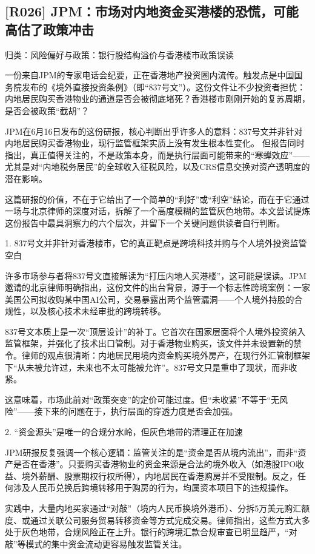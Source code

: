 \documentclass[11pt]{ctexart}
\begin{document}
\subsection{[R026] JPM：市场对内地资金买港楼的恐慌，可能高估了政策冲击}
{\small\color{refgray}归类：风险偏好与政策：银行股结构溢价与香港楼市政策误读}

一份来自JPM的专家电话会纪要，正在香港地产投资圈内流传。触发点是中国国务院发布的《境外直接投资条例》（即“837号文”）。这份文件让不少投资者担忧：内地居民购买香港物业的通道是否会被彻底堵死？香港楼市刚刚开始的复苏周期，是否会被政策“截胡”？

JPM在6月16日发布的这份研报，核心判断出乎许多人的意料：837号文并非针对内地居民购买香港物业，现行监管框架实质上没有发生根本性变化。 但报告同时指出，真正值得关注的，不是政策本身，而是执行层面可能带来的“寒蝉效应”——尤其是对“内地税务居民”的全球收入征税风险，以及CRS信息交换对资产透明度的潜在影响。

这篇研报的价值，不在于它给出了一个简单的“利好”或“利空”结论，而在于它通过一场与北京律师的深度对话，拆解了一个高度模糊的监管灰色地带。本文尝试提炼这份报告中最具洞察力的六个层次，并留下一个关键问题供读者自行判断。

1. 837号文并非针对香港楼市，它的真正靶点是跨境科技并购与个人境外投资监管空白

许多市场参与者将837号文直接解读为“打压内地人买港楼”，这可能是误读。JPM邀请的北京律师明确指出，这份文件的出台背景，源于一个标志性跨境案例：一家美国公司拟收购某中国AI公司，交易暴露出两个监管漏洞——个人境外持股的合规性，以及核心技术未经审批的跨境转移。

837号文本质上是一次“顶层设计”的补丁。它首次在国家层面将个人境外投资纳入监管框架，并强化了技术出口管制。对于香港物业购买，该文件并未设置新的禁令。律师的观点很清晰：内地居民用境内资金购买境外房产，在现行外汇管制框架下“从未被允许过，未来也不太可能被允许”。837号文只是重申了现状，而非收紧。

这意味着，市场此前对“政策突变”的定价可能过度。但“未收紧”不等于“无风险”——接下来的问题在于，执行层面的穿透力度是否会加强。

2. “资金源头”是唯一的合规分水岭，但灰色地带的清理正在加速

JPM研报反复强调一个核心逻辑：监管关注的是“资金是否从境内流出”，而非“资产是否在香港”。只要购买香港物业的资金来源是合法的境外收入（如港股IPO收益、境外薪酬、股票期权行权所得），内地居民在香港购房并不受限制。反之，任何涉及人民币兑换后跨境转移用于购房的行为，均属资本项目下的违规操作。

实践中，大量内地买家通过“对敲”（境内人民币换境外港币）、分拆5万美元购汇额度、或通过关联公司服务贸易转移资金等方式完成交易。律师指出，这些方式大多处于灰色地带，合规风险正在上升。银行的跨境汇款合规审查已明显趋严，“对敲”等模式的集中资金流动更容易触发监管关注。
\end{document}
